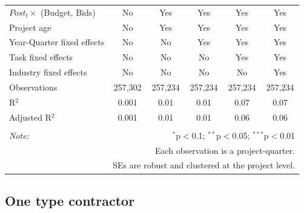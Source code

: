 \documentclass[
]{article}
\begin{document}
\begin{table}[H]
\begin{tabular}{@{\extracolsep{-2pt}}lccccc}
$Post_t \times$  (Budget, Bids) & No & Yes & Yes & Yes & Yes \\ 
Project age & No & Yes & Yes & Yes & Yes \\ 
Year-Quarter fixed effects & No & No & Yes & Yes & Yes \\ 
Task fixed effects & No & No & No & Yes & Yes \\ 
Industry fixed effects & No & No & No & No & Yes \\ 
Observations & 257,302 & 257,234 & 257,234 & 257,234 & 257,234 \\ 
R$^{2}$ & 0.001 & 0.01 & 0.01 & 0.07 & 0.07 \\ 
Adjusted R$^{2}$ & 0.001 & 0.01 & 0.01 & 0.06 & 0.06 \\ 
\hline 
\hline \\[-1.8ex] 
\textit{Note:}  & \multicolumn{5}{r}{$^{*}$p$<$0.1; $^{**}$p$<$0.05; $^{***}$p$<$0.01} \\ 
 & \multicolumn{5}{r}{Each observation is a project-quarter.} \\ 
 & \multicolumn{5}{r}{SEs are robust and clustered at the project level.} \\ 
\end{tabular} 
\end{table}

\hypertarget{one-type-contractor}{%
\subsection{One type contractor}\label{one-type-contractor}}
\end{document}
